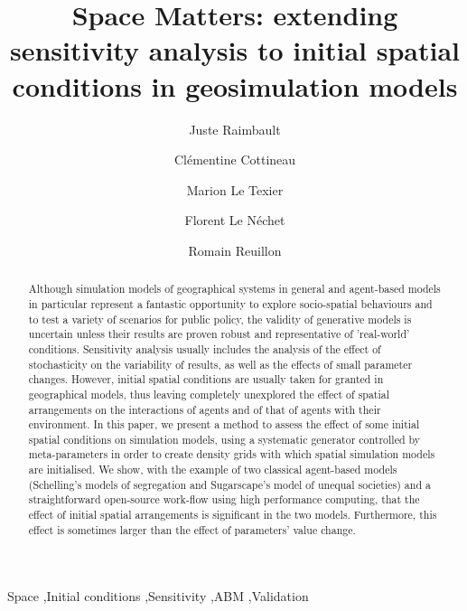 \documentclass[preprint,5p,times,twocolumn,authoryear]{elsarticle}
\begin{document}
\begin{frontmatter}

\title{Space Matters: extending sensitivity analysis to initial spatial conditions in geosimulation models}

\author[a,b]{Juste Raimbault}
\author[c,d]{Cl{\' e}mentine Cottineau}
\author[e]{Marion Le Texier}
\author[f]{Florent Le N{\' e}chet}
\author[a]{Romain Reuillon}

\address[a]{UPS CNRS 3611 ISC-PIF, Paris, France}
\address[b]{UMR CNRS 8504 G{\'e}ographie-cit{\'e}s, Paris, France}
\address[c]{Centre for Advanced Spatial Analysis, University College London, UK}
\address[d]{UMR CNRS 8097 Centre Maurice Halbwachs, Paris, France}
\address[e]{UMR 6266 IDEES, Universit{\'e} de Rouen Normandie, France}
\address[f]{Universit{\'e} Paris-Est, Laboratoire Ville Mobilité Transport, Marne-la-Vallée, France}





\begin{abstract}
Although simulation models of geographical systems in general and agent-based models in particular represent a fantastic opportunity to explore socio-spatial behaviours and to test a variety of scenarios for public policy, the validity of generative models is uncertain unless their results are proven robust and representative of 'real-world' conditions. Sensitivity analysis usually includes the analysis of the effect of stochasticity on the variability of results, as well as the effects of small parameter changes. However, initial spatial conditions are usually taken for granted in geographical models, thus leaving completely unexplored the effect of spatial arrangements on the interactions of agents and of that of agents with their environment. In this paper, we present a method to assess the effect of some initial spatial conditions on simulation models, using a systematic generator controlled by meta-parameters in order to create density grids with which spatial simulation models are initialised. We show, with the example of two classical agent-based models (Schelling's models of segregation and Sugarscape's model of unequal societies) and a straightforward open-source work-flow using high performance computing, that the effect of initial spatial arrangements is significant in the two models. Furthermore, this effect is sometimes larger than the effect of parameters' value change. 
\end{abstract}

\begin{keyword}
Space \sep Initial conditions \sep Sensitivity \sep ABM \sep Validation
\end{keyword}

\end{frontmatter}
\end{document}

